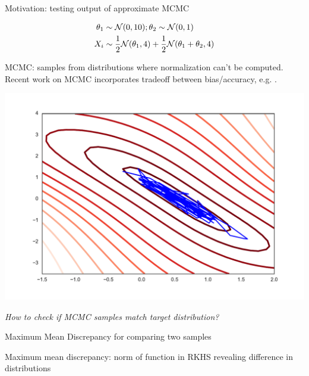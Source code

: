 


\begin{frame}
\begin{columns}
\begin{column}{.33\linewidth}
\begin{block}{Motivation: testing output of approximate MCMC}
\begin{minipage}{.49\linewidth}

\begin{align*}
 \theta_{1}&\sim{\cal N}(0,10);\theta_{2}\sim{\cal N}(0,1) \\
 X_{i} &\sim\frac{1}{2}{\cal N}(\theta_{1},4)+\frac{1}{2}{\cal N}(\theta_{1}+\theta_{2},4)
\end{align*}
 \vspace{1cm} 


MCMC: samples from distributions where normalization can't be computed.
Recent work on MCMC  incorporates tradeoff between bias/accuracy, e.g. \cite{korattikara2013austerity}.
\end{minipage}
\begin{minipage}{.4\linewidth}
\includegraphics[scale=0.7]{../../presentation/img/sgld_trace_and_density.pdf}
\end{minipage}
\vspace{1cm}
\begin{center}
\Large
\emph{How to check if MCMC samples match target distribution?}
\end{center}
\end{block}
\vspace{-0.75cm}
\begin{block}{Maximum Mean Discrepancy for comparing two samples}
\begin{center}Maximum mean discrepancy: norm of function in RKHS revealing difference in distributions\end{center}
\begin{minipage}{.60\linewidth}


\end{minipage}
\end{block}
\end{column}
\end{columns}
\end{frame}
